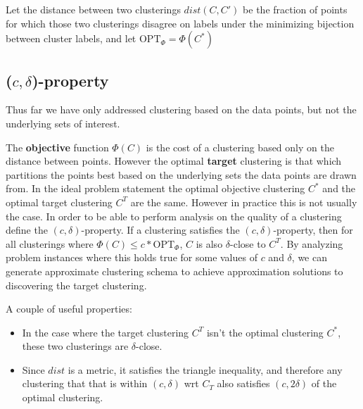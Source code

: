 \documentclass[paper=a4, fontsize=10.5pt]{scrartcl} %
\numberwithin{equation}{section} %
\numberwithin{figure}{section} %
\numberwithin{table}{section} %
\begin{document}
Let the distance between two clusterings $dist(C, C')$ be the 
fraction of points for which those two clusterings disagree on labels under the minimizing bijection between cluster labels, and let $\text{OPT}_\Phi = \Phi(C^*)$

\subsection{($c, \delta$)-property}
Thus far we have only addressed clustering based on the data points, but not the underlying sets of interest.

The \textbf{objective} function $\Phi(C)$ is the cost of a clustering based only on the distance between points. However the optimal \textbf{target} clustering is that which partitions the points best based on the underlying sets the data points are drawn from. In the ideal problem statement the optimal objective clustering $C^*$ and the optimal target clustering $C^T$ are the same. However in practice this is not usually the case. In order to be able to perform analysis on the quality of a clustering \cite{firstpaper} define the $(c, \delta)$-property.  If a clustering satisfies the $(c, \delta)$-property, then for all clusterings where $\Phi(C) \leq c*\text{OPT}_\Phi$, $C$ is also $\delta$-close to $C^T$. By analyzing problem instances where this holds true for some values of $c$ and $\delta$, we can generate approximate clustering schema to achieve approximation solutions to discovering the target clustering.

 A couple of useful properties:

\begin{itemize}

\item In the case where the target clustering $C^T$ isn't the optimal clustering $C^*$, these two clusterings are $\delta$-close.

\item Since $dist$ is a metric, it satisfies the triangle inequality, and therefore any clustering that that is within $(c, \delta)$ wrt $C_T$ also satisfies $(c, 2\delta)$ of the optimal clustering. %



\end{itemize}

\end{document}
